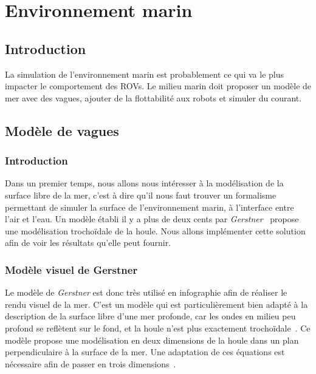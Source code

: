 	\section{Environnement marin}

		\subsection{Introduction}
			
			La simulation de l'environnement marin est probablement ce qui va le plus impacter le comportement des \gls{ROV}s. Le milieu marin doit proposer un modèle de mer avec des vagues, ajouter de la flottabilité aux robots et simuler du courant.

		\subsection{Modèle de vagues}

			\subsubsection{Introduction}

				Dans un premier temps, nous allons nous intéresser à la modélisation de la surface libre de la mer, c'est à dire qu'il nous faut trouver un formalisme permettant de simuler la surface de l'environnement marin, à l'interface entre l'air et l'eau. Un modèle établi il y a plus de deux cents par \textit{Gerstner}~\cite{Gerstner} propose une modélisation trochoïdale de la houle. Nous allons implémenter cette solution afin de voir les résultats qu'elle peut fournir.

			\subsubsection{Modèle visuel de Gerstner}

				Le modèle de \textit{Gerstner} est donc très utilisé en infographie afin de réaliser le rendu visuel de la mer. C'est un modèle qui est particulièrement bien adapté à la description de la surface libre d'une mer profonde, car les ondes en milieu peu profond se reflètent sur le fond, et la houle n'est plus exactement trochoïdale~\cite{Gerstner, Constantin_2001}. Ce modèle propose une modélisation en deux dimensions de la houle dans un plan perpendiculaire à la surface de la mer. Une adaptation de ces équations est nécessaire afin de passer en trois dimensions~\cite{Gerstner-Like_Henry}.

